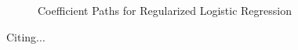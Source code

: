 \documentclass[]{article}
\begin{document}
\begin{figure}[h!]
\centering
{}
\caption{Coefficient Paths for Regularized Logistic Regression}
\label{fig:Coeff_paths}
\end{figure}

Citing...
\cite{ratinov2009design}



\end{document}
